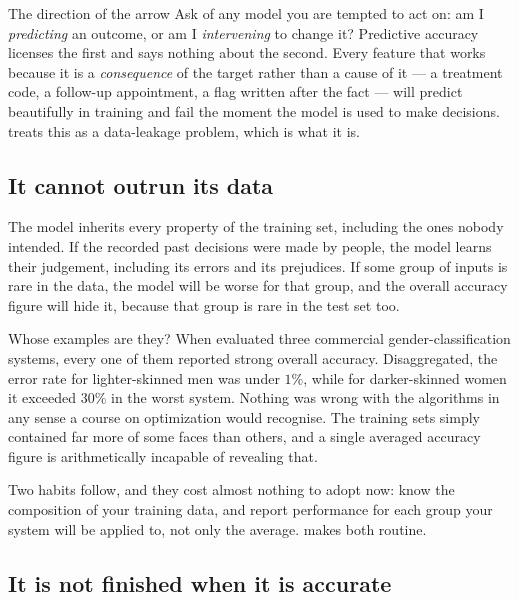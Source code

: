 \begin{pitfall}{The direction of the arrow}
Ask of any model you are tempted to act on: am I \emph{predicting} an outcome, or
am I \emph{intervening} to change it? Predictive accuracy licenses the first and
says nothing about the second. Every feature that works because it is a
\emph{consequence} of the target rather than a cause of it --- a treatment code,
a follow-up appointment, a flag written after the fact --- will predict
beautifully in training and fail the moment the model is used to make decisions.
 treats this as a data-leakage problem, which is what it is.
\end{pitfall}

\subsection{It cannot outrun its data}

The model inherits every property of the training set, including the ones nobody
intended. If the recorded past decisions were made by people, the model learns
their judgement, including its errors and its prejudices. If some group of inputs
is rare in the data, the model will be worse for that group, and the overall
accuracy figure will hide it, because that group is rare in the test set too.

\begin{ethicsnote}{Whose examples are they?}
When \textcite{buolamwini2018} evaluated three commercial gender-classification
systems, every one of them reported strong overall accuracy. Disaggregated, the
error rate for lighter-skinned men was under $1\%$, while for darker-skinned
women it exceeded $30\%$ in the worst system. Nothing was wrong with the
algorithms in any sense a course on optimization would recognise. The training
sets simply contained far more of some faces than others, and a single averaged
accuracy figure is arithmetically incapable of revealing that.

Two habits follow, and they cost almost nothing to adopt now: know the
composition of your training data, and report performance for each group your
system will be applied to, not only the average.  makes both
routine.
\end{ethicsnote}

\subsection{It is not finished when it is accurate}

